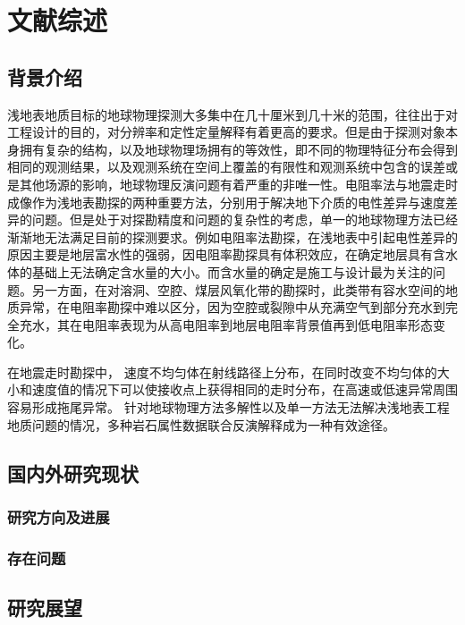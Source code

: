 \cleardoublepage
\newrefsection
\chapter{文献综述}

\section{背景介绍}


浅地表地质目标的地球物理探测大多集中在几十厘米到几十米的范围，往往出于对工程设计的目的，对分辨率和定性定量解释有着更高的要求。但是由于探测对象本身拥有复杂的结构，以及地球物理场拥有的等效性，即不同的物理特征分布会得到相同的观测结果，以及观测系统在空间上覆盖的有限性和观测系统中包含的误差或是其他场源的影响，地球物理反演问题有着严重的非唯一性。电阻率法与地震走时成像作为浅地表勘探的两种重要方法，分别用于解决地下介质的电性差异与速度差异的问题。但是处于对探勘精度和问题的复杂性的考虑，单一的地球物理方法已经渐渐地无法满足目前的探测要求。例如电阻率法勘探，在浅地表中引起电性差异的原因主要是地层富水性的强弱，因电阻率勘探具有体积效应，在确定地层具有含水体的基础上无法确定含水量的大小。而含水量的确定是施工与设计最为关注的问题。另一方面，在对溶洞、空腔、煤层风氧化带的勘探时，此类带有容水空间的地质异常，在电阻率勘探中难以区分，因为空腔或裂隙中从充满空气到部分充水到完全充水，其在电阻率表现为从高电阻率到地层电阻率背景值再到低电阻率形态变化。

在地震走时勘探中， 速度不均匀体在射线路径上分布，在同时改变不均匀体的大小和速度值的情况下可以使接收点上获得相同的走时分布，在高速或低速异常周围容易形成拖尾异常。 针对地球物理方法多解性以及单一方法无法解决浅地表工程地质问题的情况，多种岩石属性数据联合反演解释成为一种有效途径。



\section{国内外研究现状}

\subsection{研究方向及进展}



\subsection{存在问题}

\section{研究展望}

\newpage
\begingroup
    \printbibliography[title={参考文献}]
\endgroup
